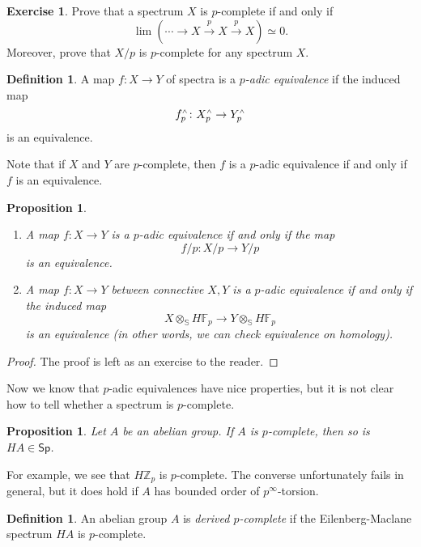 \documentclass[10pt]{amsart}
\newtheorem{prop}[thm]{Proposition}
\theoremstyle{definition}
\newtheorem{defn}[thm]{Definition}
\newtheorem{exer}[thm]{Exercise}
\theoremstyle{remark}
\theoremstyle{plain}
\theoremstyle{definition}
\theoremstyle{remark}
\newcommand{\Z}{\mathbb{Z}}
\newcommand{\F}{\mathbb{F}}
\newcommand{\bS}{\mathbb{S}}
\newcommand{\ms}[1]{\mathsf{#1}}
\newcommand{\1}{\mathbf{1}}
\newcommand{\2}{\mathbf{2}}
\newcommand{\3}{\mathbf{3}}
\newcommand{\sw}{\mathsmaller{\wedge}}
\begin{document}
\begin{exer}
    Prove that a spectrum $X$ is $p$-complete if and only if
    \[ \lim (\cdots \to X \xrightarrow{p} X \xrightarrow{p} X) \simeq 0. \]
    Moreover, prove that $X/p$ is $p$-complete for any spectrum $X$.
\end{exer}

\begin{defn}
    A map $f \colon X \to Y$ of spectra is a \textit{$p$-adic equivalence} if the induced map
    \[ f_p^{\sw} \colon X_p^{\sw} \to Y_p^{\sw} \]
    is an equivalence.
\end{defn}

Note that if $X$ and $Y$ are $p$-complete, then $f$ is a $p$-adic equivalence if and only if $f$ is an equivalence.

\begin{prop}\leavevmode
    \begin{enumerate}
        \item A map $f \colon X \to Y$ is a $p$-adic equivalence if and only if the map
        \[ f/p \colon X/p \to Y/p \]
        is an equivalence.
        \item A map $f \colon X \to Y$ between connective $X, Y$ is a $p$-adic equivalence if and only if the induced map
        \[ X \otimes_{\bS} H\F_p \to Y \otimes_{\bS} H\F_p \]
        is an equivalence (in other words, we can check equivalence on homology).
    \end{enumerate}
\end{prop}

\begin{proof}
    The proof is left as an exercise to the reader.
\end{proof}

Now we know that $p$-adic equivalences have nice properties, but it is not clear how to tell whether a spectrum is $p$-complete.

\begin{prop}
    Let $A$ be an abelian group. If $A$ is $p$-complete, then so is $HA \in \ms{Sp}$.
\end{prop}

For example, we see that $H \Z_p$ is $p$-complete. The converse unfortunately fails in general, but it does hold if $A$ has bounded order of $p^{\infty}$-torsion.

\begin{defn}
    An abelian group $A$ is \textit{derived $p$-complete} if the Eilenberg-Maclane spectrum $HA$ is $p$-complete.
\end{defn}
\end{document}
